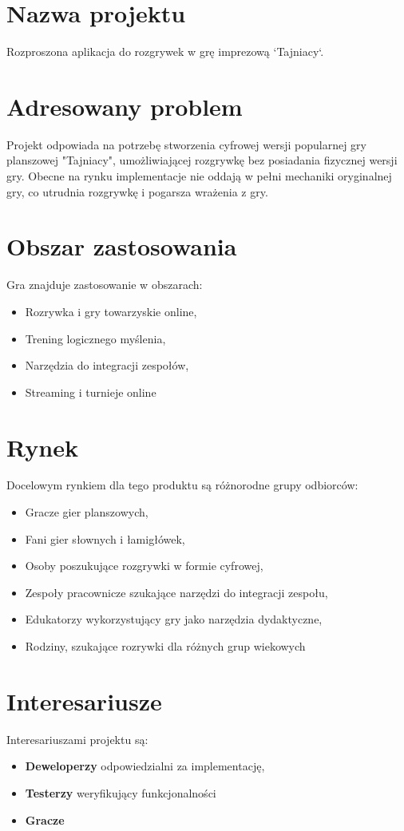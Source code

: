 \documentclass[12pt,a4paper]{book}
\begin{document}
\section{Nazwa projektu}
Rozproszona aplikacja do rozgrywek w grę imprezową `Tajniacy`.

\section{Adresowany problem}
Projekt odpowiada na potrzebę stworzenia cyfrowej wersji popularnej gry planszowej "Tajniacy", umożliwiającej rozgrywkę bez posiadania fizycznej wersji gry. Obecne na rynku implementacje nie oddają w pełni mechaniki oryginalnej gry, co utrudnia rozgrywkę i pogarsza wrażenia z gry.

\section{Obszar zastosowania}
Gra znajduje zastosowanie w obszarach:
\begin{itemize}
    \item Rozrywka i gry towarzyskie online, 
    \item Trening logicznego myślenia, 
    \item Narzędzia do integracji zespołów,
    \item Streaming i turnieje online
\end{itemize}

\section{Rynek}
Docelowym rynkiem dla tego produktu są różnorodne grupy odbiorców:
\begin{itemize}
    \item Gracze gier planszowych, 
    \item Fani gier słownych i łamigłówek, 
    \item Osoby poszukujące rozgrywki w formie cyfrowej, 
    \item Zespoły pracownicze szukające narzędzi do integracji zespołu,
    \item Edukatorzy wykorzystujący gry jako narzędzia dydaktyczne,
    \item Rodziny, szukające rozrywki dla różnych grup wiekowych
\end{itemize}

\section{Interesariusze}
Interesariuszami projektu są:
\begin{itemize}
    \item \textbf{Deweloperzy} odpowiedzialni za implementację, 
    \item \textbf{Testerzy} weryfikujący funkcjonalności 
    \item \textbf{Gracze}
\end{itemize}
\end{document}
